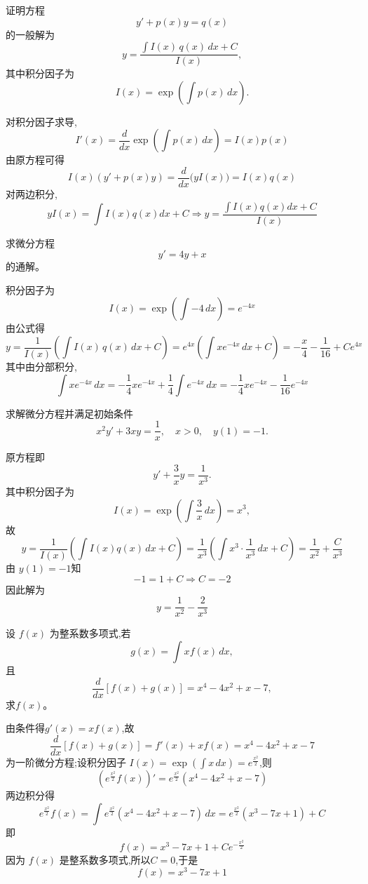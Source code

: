 \begin{questions}
    \question 证明方程
    \[
    y' + p(x)y = q(x)
    \]
    的一般解为
    \[
    y = \frac{\displaystyle \int I(x)\,q(x)\,dx + C}{I(x)},
    \]
    其中积分因子为
    \[
    I(x)=\exp{\left(\int p(x)\,dx\right)}.
    \]
    \begin{solution}
        对积分因子求导,
        \[
        I'(x)=\frac{d}{dx} \exp{\left(\int p(x)\,dx\right)}=I(x)p(x)
        \]
        由原方程可得
        \[
        I(x)(y' + p(x)y)=\frac{d}{dx}\bigl(yI(x)\bigr)=I(x)q(x)
        \]
        对两边积分,
        \[
        yI(x)=\int I(x)q(x)dx + C \Rightarrow y=\frac{\displaystyle \int I(x)q(x)dx + C}{I(x)}
        \]
    \end{solution}

    \question 求微分方程
    \[
    y' = 4y + x
    \]
    的通解。
    \begin{solution}
        积分因子为
        \[
        I(x)=\exp{\left(\int -4\,dx\right)}=e^{-4x}
        \]
        由公式得
        \[
        y=\frac{1}{I(x)}\left(\int I(x)\,q(x)\,dx + C\right)
        = e^{4x}\left(\int x e^{-4x}\,dx + C\right)= -\frac{x}{4} - \frac{1}{16} + Ce^{4x}
        \]
        其中由分部积分,
        \[
        \int x e^{-4x}\,dx
        =-\frac{1}{4}x e^{-4x} + \frac{1}{4}\int e^{-4x}\,dx
        =-\frac{1}{4}x e^{-4x} - \frac{1}{16}e^{-4x}
        \]
    \end{solution}

    \question 求解微分方程并满足初始条件
    \[
    x^{2}y' + 3xy = \frac{1}{x},\quad x>0,\quad y(1)=-1.
    \]
    \begin{solution}
        原方程即
        \[
        y' + \frac{3}{x}y = \frac{1}{x^{3}}.
        \]
        其中积分因子为
        \[
        I(x)=\exp{\left(\int \frac{3}{x}\,dx\right)} =x^{3},
        \]
        故
        \[
        y=\frac{1}{I(x)}\left( \int I(x)q(x)\,dx + C \right)
        = \frac{1}{x^{3}}\left( \int x^{3}\cdot \frac{1}{x^{3}}\,dx + C \right)
        = \frac{1}{x^{2}} + \frac{C}{x^{3}}
        \]
        由 $y(1)=-1$知
        \[
        -1 = 1 + C \Rightarrow C=-2
        \]
        因此解为
        \[
        y=\frac{1}{x^{2}} - \frac{2}{x^{3}}
        \]
    \end{solution}

    \question 设 $f(x)$ 为整系数多项式,若 
    \[
    g(x) = \int x f(x) \, dx,
    \]
    且
    \[
    \frac{d}{dx}[f(x) + g(x)] = x^4 - 4x^2 + x - 7,
    \]
    求$f(x)$。
    \begin{solution}
        由条件得$g'(x) = x f(x)$,故
        \[
        \frac{d}{dx}[f(x) + g(x)] = f'(x) + x f(x) = x^4 - 4x^2 + x - 7
        \]
        为一阶微分方程;设积分因子 $I(x) =\exp{\displaystyle \left(\int x\,dx\right)} = e^{\frac{x^2}{2}}$,则
        \[
        \left( e^{\frac{x^2}{2}} f(x) \right)' = e^{\frac{x^2}{2}}(x^4 - 4x^2 + x - 7)
        \]
        两边积分得
        \[
        e^{\frac{x^2}{2}} f(x) = \int e^{\frac{x^2}{2}}(x^4 - 4x^2 + x - 7) \, dx
        = e^{\frac{x^2}{2}}(x^3 - 7x + 1) + C
        \]
        即\[
        f(x) = x^3 - 7x + 1 + C e^{-\frac{x^2}{2}}
        \]
        因为 $f(x)$ 是整系数多项式,所以$C = 0$,于是
        \[
        f(x) = x^3 - 7x + 1
        \]  
    \end{solution}


\end{questions}
